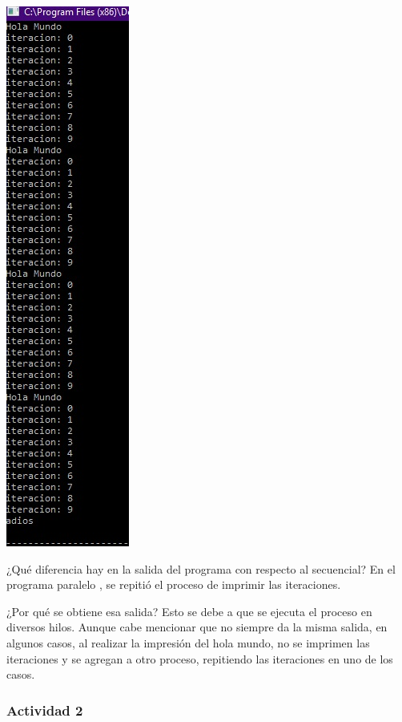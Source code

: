 \documentclass[12pt,letterpaper]{article}
\begin{document}
\begin{flushleft}
\includegraphics[scale=.8]{ejercicio11.jpg} 

\end{flushleft}




¿Qué diferencia hay en la salida del programa con respecto al secuencial?
En el programa paralelo , se repitió el proceso de imprimir las iteraciones. 

¿Por qué se obtiene esa salida?
Esto se debe a que se ejecuta el proceso en diversos hilos. Aunque cabe mencionar que no siempre da la misma salida, en algunos casos, al realizar la impresión del hola mundo, no se imprimen las iteraciones y se agregan a otro proceso, repitiendo las iteraciones en uno de los casos.
\subsubsection*{Actividad 2}
\end{document}
